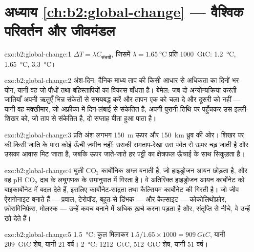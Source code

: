 \section*{अध्याय \ref{ch:b2:global-change} --- वैश्विक परिवर्तन और जीवमंडल}

\begin{solution}{exo:b2:global-change:1}
$\Delta T = \lambda C_{\text{संचयी}}$, जिसमें $\lambda = \qty{1.65}{\celsius}$
प्रति \qty{1000}{GtC}: \qty{1.2}{\celsius}, \qty{1.65}{\celsius},
\qty{3.3}{\celsius}।
\end{solution}

\begin{solution}{exo:b2:global-change:2}
अंश-दिन: दैनिक माध्य ताप की किसी आधार से अधिकता का
दिनों भर योग, यानी वह  जो पौधों तथा बहिस्तापियों का
विकास बाँधता है। बेमेल: जब दो अन्योन्यक्रिया करती जातियाँ अपनी ऋतुएँ
भिन्न संकेतों से समयबद्ध करें और तापन एक को चला दे और दूसरी को नहीं ---
यानी वह मक्खीमार, जो अफ़्रीका में दिन-लंबाई से संकेतित है, अपनी पुरानी
तिथि पर पहुँचकर उस इल्ली-शिखर को, जो ताप से संकेतित है, दो सप्ताह बीता हुआ पाता है।
\end{solution}

\begin{solution}{exo:b2:global-change:3}
प्रति अंश लगभग \qty{150}{m} ऊपर और \qty{150}{km} ध्रुव की ओर। शिखर पर
की किसी जाति के पास कोई ऊँची ज़मीन नहीं: उसकी समताप-रेखा उस पर्वत से
ऊपर चढ़ जाती है और उसका आवास मिट जाता है, जबकि ऊपर जाते-जाते हर
पट्टी का क्षेत्रफल ऊँचाई के साथ सिकुड़ता है।
\end{solution}

\begin{solution}{exo:b2:global-change:4}
घुली \ensuremath{\mathrm{CO_2}} कार्बोनिक अम्ल बनाती है, जो
हाइड्रोजन आयन छोड़ता है, और वह pH \ensuremath{\mathrm{CO_2}} दाब के
लघुगणक के समानुपात में गिरता है। वे अतिरिक्त
हाइड्रोजन आयन कार्बोनेट को बाइकार्बोनेट में बदल देते हैं, इसलिए
कार्बोनेट-सांद्रता तथा कैल्सियम कार्बोनेट की  गिरती है।
जो जीव ऐरागोनाइट बनाते हैं --- प्रवाल, टेरोपॉड, बहुत-से डिंभक
--- और कैल्साइट --- कोकोलिथोफ़ोर, फ़ोरामिनिफ़ेरा, मोलस्क ---
उन्हें कवच बनाने में अधिक ख़र्च करना पड़ता है और, संतृप्ति से नीचे, वे उन्हें खो देते हैं।
\end{solution}

\begin{solution}{exo:b2:global-change:5}
\qty{1.5}{\celsius}: कुल मिलाकर $1.5/1.65\times 1000 = \qty{909}{GtC}$,
यानी \qty{209}{GtC} शेष, यानी 21 वर्ष। \qty{2}{\celsius}:
\qty{1212}{GtC}, \qty{512}{GtC} शेष, यानी 51 वर्ष।
\end{solution}

